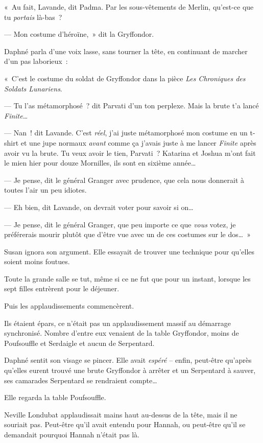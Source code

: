«~Au fait, Lavande, dit Padma. Par les sous-vêtements de Merlin, qu'est-ce que tu \emph{portais} là-bas~?

--- Mon costume d'héroïne,~» dit la Gryffondor.

Daphné parla d'une voix lasse, sans tourner la tête, en continuant de marcher d'un pas laborieux~:

«~C'est le costume du soldat de Gryffondor dans la pièce \emph{Les Chroniques des Soldats Lunariens}.

--- Tu l'as métamorphosé~? dit Parvati d'un ton perplexe. Mais la brute t'a lancé \emph{Finite}…

--- Nan~! dit Lavande. C'est \emph{réel}, j'ai juste métamorphosé mon costume en un t-shirt et une jupe normaux \emph{avant} comme ça j'avais juste à me lancer \emph{Finite} après avoir vu la brute. Tu veux avoir le tien, Parvati~? Katarina et Joshua m'ont fait le mien hier pour douze Mornilles, ils sont en sixième année…

--- Je pense, dit le général Granger avec prudence, que cela nous donnerait à toutes l'air un peu idiotes.

--- Eh bien, dit Lavande, on devrait voter pour savoir si on…

--- Je pense, dit le général Granger, que peu importe ce que \emph{vous} votez, je préférerais mourir plutôt que d'être vue avec un de ces costumes sur le dos…~»

Susan ignora son argument. Elle essayait de trouver une technique pour qu'elles soient moins foutues.

\later

Toute la grande salle se tut, même si ce ne fut que pour un instant, lorsque les sept filles entrèrent pour le déjeuner.

Puis les applaudissements commencèrent.

Ils étaient épars, ce n'était pas un applaudissement massif au démarrage synchronisé. Nombre d'entre eux venaient de la table Gryffondor, moins de Poufsouffle et Serdaigle et aucun de Serpentard.

Daphné sentit son visage se pincer. Elle avait \emph{espéré} -- enfin, peut-être qu'après qu'elles eurent trouvé une brute Gryffondor à arrêter et un Serpentard à sauver, ses camarades Serpentard se rendraient compte…

Elle regarda la table Poufsouffle.

Neville Londubat applaudissait mains haut au-dessus de la tête, mais il ne souriait pas. Peut-être qu'il avait entendu pour Hannah, ou peut-être qu'il se demandait pourquoi Hannah n'était pas là.

